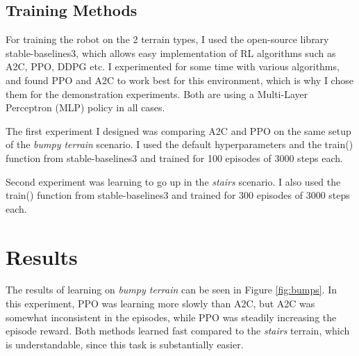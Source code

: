 \documentclass{article}
\begin{document}
\subsection{Training Methods}
For training the robot on the 2 terrain types, I used the open-source library stable-baselines3, which allows easy implementation of RL algorithms such as A2C, PPO, DDPG etc.
I experimented for some time with various algorithms, and found PPO and A2C to work best for this environment, which is why I chose them for the demonstration experiments.
Both are using a Multi-Layer Perceptron (MLP) policy in all cases.

The first experiment I designed was comparing A2C and PPO on the same setup of the \textit{bumpy terrain} scenario.
I used the default hyperparameters and the train() function from stable-baselines3 and trained for 100 episodes of 3000 steps each.

Second experiment was learning to go up in the \textit{stairs} scenario. 
I also used the train() function from stable-baselines3 and trained for 300 episodes of 3000 steps each.

\section{Results}
The results of learning on \textit{bumpy terrain} can be seen in Figure \ref{fig:bumps}.
In this experiment, PPO was learning more slowly than A2C, but A2C was somewhat inconsistent in the episodes, while PPO was steadily increasing the episode reward.
Both methods learned fast compared to the \textit{stairs} terrain, which is understandable, since this task is substantially easier.
\end{document}
